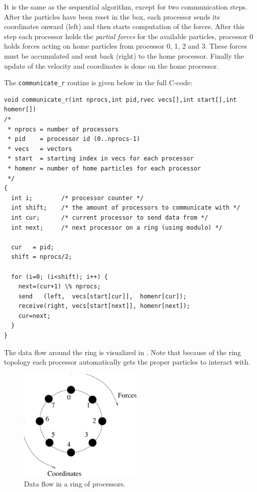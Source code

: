 It is the same as the sequential algorithm, except for two
communication steps. After the particles have been reset in the box,
each processor sends its coordinates onward (left) and then starts computation
of the forces.  After this step each processor holds the {\em partial
forces} for the available particles, {\eg} processor 0 holds forces
acting on home particles from processor 0, 1, 2 and 3. These forces
must be accumulated and sent back (right) to the home
processor. Finally the update of the velocity and coordinates is done
on the home processor.

The {\tt communicate_r} routine is given below in the full C-code:\\
\begin{footnotesize}
\begin{verbatim}
void communicate_r(int nprocs,int pid,rvec vecs[],int start[],int homenr[])
/* 
 * nprocs = number of processors
 * pid    = processor id (0..nprocs-1)
 * vecs   = vectors
 * start  = starting index in vecs for each processor
 * homenr = number of home particles for each processor
 */
{
  int i;        /* processor counter */
  int shift;    /* the amount of processors to communicate with */
  int cur;      /* current processor to send data from */
  int next;     /* next processor on a ring (using modulo) */

  cur   = pid;
  shift = nprocs/2;

  for (i=0; (i<shift); i++) {
    next=(cur+1) \% nprocs;     
    send   (left,  vecs[start[cur]],  homenr[cur]);
    receive(right, vecs[start[next]], homenr[next]);
    cur=next;
  }
}
\end{verbatim}

\end{footnotesize}

The data flow around the ring is visualized in . 
Note that because of the ring topology each processor automatically 
gets the proper particles to interact with.
\begin {figure}
\centerline{\includegraphics[width=6cm]{plots/ring}}
\caption {Data flow in a ring of processors.}
\label{fig:ring}
\end {figure}

